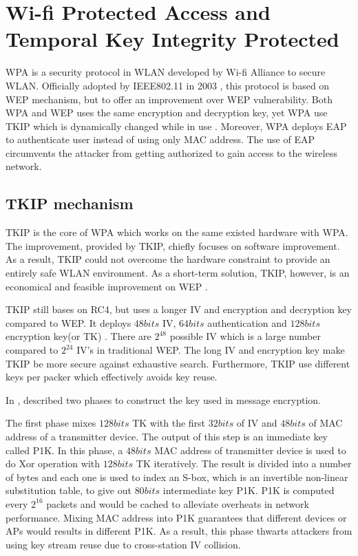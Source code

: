 \section{Wi-fi Protected Access and Temporal Key Integrity Protected}

\ac{WPA} is a security protocol in \ac{WLAN} developed by Wi-fi Alliance to secure \ac{WLAN}. Officially adopted by \ac{IEEE}802.11 in 2003 \cite{1318903}, this protocol is based on \ac{WEP} mechanism, but to offer an improvement over \ac{WEP} vulnerability. Both \ac{WPA} and \ac{WEP} uses the same encryption and decryption key, yet \ac{WPA} use \ac{TKIP} which is dynamically changed while in use \cite{wpa(wi-fiprotectedaccess)definition}. Moreover, \ac{WPA} deploys \ac{EAP} to authenticate user instead of using only \ac{MAC} address. The use of \ac{EAP} circumvents the attacker from getting authorized to gain access to the wireless network.

\subsection{TKIP mechanism}
\ac{TKIP} is the core of \ac{WPA} which works on the same existed hardware with \ac{WPA}. The improvement, provided by \ac{TKIP}, chiefly focuses on software improvement. As a result, \ac{TKIP} could not overcome the hardware constraint to provide an entirely safe \ac{WLAN} environment. As a short-term solution, \ac{TKIP}, however, is an economical and feasible improvement on \ac{WEP} \cite{al2006ieee}.

\ac{TKIP} still bases on \ac{RC4}, but uses a longer \ac{IV} and encryption and decryption key compared to \ac{WEP}. It deploys $48 bits$ \ac{IV}, $64 bits$ authentication and $128 bits$ encryption key(or \ac{TK}) \cite{potter2003wireless}. There are $2^{48}$ possible \ac{IV} which is a large number compared to $2^24$ IV's in traditional \ac{WEP}. The long \ac{IV} and encryption key make \ac{TKIP} be more secure against exhaustive search. Furthermore, \ac{TKIP} use different keys per packer which effectively avoids key reuse.

In \cite{doomun2012modified}, \citeauthor{doomun2012modified} described two phases to construct the key used in message encryption.

The first phase mixes $128 bits$ \ac{TK} with the first $32 bits$ of \ac{IV} and $48 bits$ of \ac{MAC} address of a transmitter device. The output of this step is an immediate key called \ac{P1K}. In this phase, a $48 bits$ \ac{MAC} address of transmitter device is used to do \ac{Xor} operation with $128 bits$ \ac{TK} iteratively. The result is divided into a number of bytes and each one is used to index an S-box, which is an invertible non-linear substitution table, to give out $80 bits$ intermediate key \ac{P1K}. \ac{P1K} is computed every $2^{16}$ packets and would be cached to alleviate overheats in network performance. Mixing \ac{MAC} address into \ac{P1K} guarantees that different devices or \ac{AP}s would results in different \ac{P1K}. As a result, this phase thwarts attackers from using key stream reuse due to cross-station \ac{IV} collision. 

